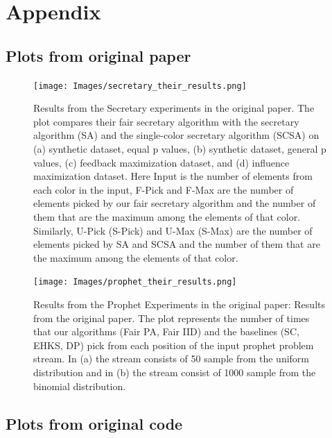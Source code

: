 \newpage
\section*{Appendix}

\subsection{Plots from original paper}

\begin{figure}[h!]
    \texttt{[image: Images/secretary\_their\_results.png]}
    \caption{Results from the Secretary experiments in the original paper. The plot compares their fair secretary algorithm with the secretary algorithm (SA) and the single-color secretary algorithm (SCSA) on (a) synthetic dataset, equal p values, (b) synthetic dataset, general p values, (c) feedback maximization dataset, and (d) influence maximization dataset. Here Input is the number of elements from each color in the input, F-Pick and F-Max are the number of elements picked by our fair secretary algorithm and the number of them that are the maximum among the elements of that color. Similarly, U-Pick (S-Pick) and U-Max (S-Max) are the number of elements picked by SA and SCSA and the number of them that are the maximum among the elements of that color.}
    \label{fig:secretary_original_results}
\end{figure}

\begin{figure}[h!]
    \texttt{[image: Images/prophet\_their\_results.png]}
    \caption{Results from the Prophet Experiments in the original paper: Results from the original paper. The plot represents the number of times that our algorithms (Fair PA, Fair IID) and the baselines (SC, EHKS, DP) pick from each position of the input prophet problem stream. In (a) the stream consists of 50 sample from the uniform distribution and in (b) the stream consist of 1000 sample from the binomial distribution.}
    \label{fig:prophet_original_results}
\end{figure}


\newpage
\subsection{Plots from original code}

